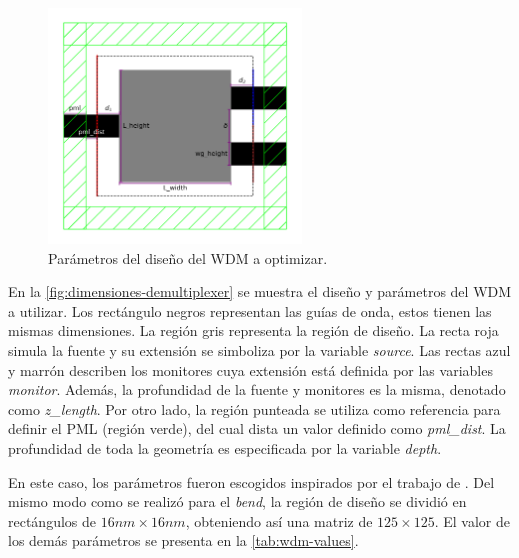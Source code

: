 \begin{figure}[ht]
  \centering
  \includegraphics[width=0.6\textwidth]{image/proposal/wdm.png}
  \caption{Parámetros del diseño del WDM a optimizar.}
  \label{fig:dimensiones-demultiplexer}
\end{figure}

En la \autoref{fig:dimensiones-demultiplexer} se muestra el diseño y parámetros del WDM a utilizar.
Los rectángulo negros representan las guías de onda, estos tienen las mismas dimensiones.
La región gris representa la región de diseño.
La recta roja simula la fuente y su extensión se simboliza por la variable \emph{source}.
Las rectas azul y marrón describen los monitores cuya extensión está definida por las variables \emph{monitor}.
Además, la profundidad de la fuente y monitores es la misma, denotado como \emph{z\_length}.
Por otro lado, la región punteada se utiliza como referencia para definir el PML (región verde),
del cual dista un valor definido como \emph{pml\_dist}.
La profundidad de toda la geometría es especificada por la variable \emph{depth}.

En este caso, los parámetros fueron escogidos inspirados por el trabajo de \cite{Christiansen2021}.
Del mismo modo como se realizó para el \emph{bend}, 
la región de diseño se dividió en rectángulos de $16nm \times 16 nm$, obteniendo así una
matriz de $125 \times 125$.
El valor de los demás parámetros se presenta en la \autoref{tab:wdm-values}.

